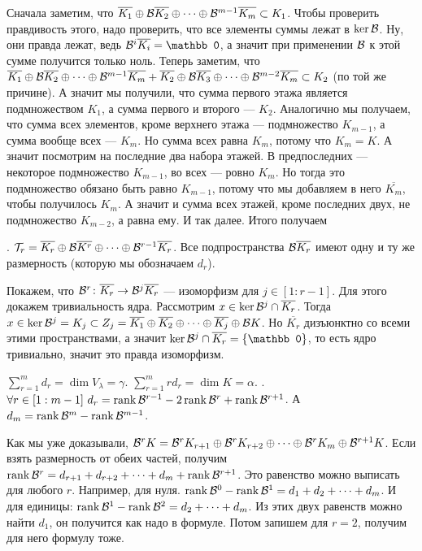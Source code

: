 \documentclass{article}
\begin{document}
\begin{itemize}
\begin{Proof}
            Сначала заметим, что $\overline{K_1}\oplus{\mathcal{B}}\overline{K_2}\oplus\cdots\oplus{\mathcal{B}}^{m-1}\overline{K_m}\subset K_1$. Чтобы проверить правдивость этого, надо проверить, что все элементы суммы лежат в $\ker{\mathcal{B}}$. Ну, они правда лежат, ведь $\scriptB^i\overline{K_i}=\mathbb0$, а значит при применении ${\mathcal{B}}$ к этой сумме получится только ноль. Теперь заметим, что $\overline{K_1}\oplus{\mathcal{B}}\overline{K_2}\oplus\cdots\oplus{\mathcal{B}}^{m-1}\overline{K_m}+\overline{K_2}\oplus{\mathcal{B}}\overline{K_3}\oplus\cdots\oplus{\mathcal{B}}^{m-2}\overline{K_m}\subset K_2$ (по той же причине). А значит мы получили, что сумма первого этажа является подмножеством $K_1$, а сумма первого и второго --- $K_2$. Аналогично мы получаем, что сумма всех элементов, кроме верхнего этажа --- подмножество $K_{m-1}$, а сумма вообще всех --- $K_m$. Но сумма всех равна $K_m$, потому что $K_m=K$. А значит посмотрим на последние два набора этажей. В предпоследних --- некоторое подмножество $K_{m-1}$, во всех --- ровно $K_m$. Но тогда это подмножество обязано быть равно $K_{m-1}$, потому что мы добавляем в него $\overline{K_m}$, чтобы получилось $K_m$. А значит и сумма всех этажей, кроме последних двух, не подмножество $K_{m-2}$, а равна ему. И так далее. Итого получаем
        \end{Proof}
        \thm {}. ${\mathcal{T}}_r=\overline{K_r}\oplus{\mathcal{B}}\overline{K^r}\oplus\cdots\oplus{\mathcal{B}}^{r-1}\overline{K_r}$. Все подпространства ${\mathcal{B}}\overline{K_r}$ имеют одну и ту же размерность (которую мы обозначаем $d_r$).
        \begin{Proof}
            Покажем, что ${\mathcal{B}}^r\colon\overline{K_r}\to{\mathcal{B}}^j\overline{K_r}$ --- изоморфизм для $j\in[1:r-1]$. Для этого докажем тривиальность ядра. Рассмотрим $x\in\ker{\mathcal{B}}^j\cap\overline{K_r}$. Тогда $x\in\ker{\mathcal{B}}^j=K_j\subset Z_j=\overline{K_1}\oplus\overline{K_2}\oplus\cdots\oplus\overline{K_j}\oplus{\mathcal{B}} K$. Но $\overline{K_r}$ дизъюнктно со всеми этими пространствами, а значит $\ker\scriptB^j\cap\overline{K_r}=\{\mathbb0\}$, то есть ядро тривиально, значит это правда изоморфизм.
        \end{Proof}
        \thm $\sum\limits_{r=1}^md_r=\dim V_\lambda=\gamma$. $\sum\limits_{r=1}^mrd_r=\dim K=\alpha$.
        \thm {}. $\forall r\in[1:m-1]~d_r=\operatorname{rank}{\mathcal{B}}^{r-1}-2\operatorname{rank}{\mathcal{B}}^r+\operatorname{rank}{\mathcal{B}}^{r+1}$. А $d_m=\operatorname{rank}{\mathcal{B}}^m-\operatorname{rank}{\mathcal{B}}^{m-1}$.
        \begin{Proof}
            Как мы уже доказывали, ${\mathcal{B}}^rK={\mathcal{B}}^rK_{r+1}\oplus{\mathcal{B}}^rK_{r+2}\oplus\cdots\oplus{\mathcal{B}}^rK_m\oplus{\mathcal{B}}^{r+1}K$. Если взять размерность от обеих частей, получим $\operatorname{rank}{\mathcal{B}}^r=d_{r+1}+d_{r+2}+\cdots+d_m+\operatorname{rank}{\mathcal{B}}^{r+1}$. Это равенство можно выписать для любого $r$. Например, для нуля. $\operatorname{rank}{\mathcal{B}}^0-\operatorname{rank}{\mathcal{B}}^1=d_1+d_2+\cdots+d_m$. И для единицы: $\operatorname{rank}{\mathcal{B}}^1-\operatorname{rank}{\mathcal{B}}^2=d_2+\cdots+d_m$. Из этих двух равенств можно найти $d_1$, он получится как надо в формуле. Потом запишем для $r=2$, получим для него формулу тоже.

\end{Proof}
\end{itemize}
\end{document}
